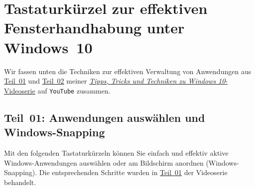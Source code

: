 \documentclass[11pt,a4paper]{scrartcl}
\begin{document}
%
\section*{Tastaturkürzel zur effektiven Fensterhandhabung unter Windows~10}
Wir fassen unten die Techniken zur effektiven Verwaltung von
Anwendungen aus \href{https://youtu.be/wjzZGac1yso}{Teil~01} und
\href{https://youtu.be/FL4_4fquuM4}{Teil~02} meiner
\href{https://youtube.com/playlist?list=PL0FqMC_xCtjQCsFwN8ci8bJhci5xMx1Bm}{\emph{Tipps,
  Tricks und Techniken zu Windows 10}-Videoserie} auf \texttt{YouTube}
zusammen.
%
\subsection*{Teil~01: Anwendungen auswählen und Windows-Snapping}
\label{subsec:windows_snapping}
%
Mit den folgenden Tastaturkürzeln können Sie einfach und effektiv
aktive Windows-Anwendungen auswählen oder am Bildschirm anordnen
(Windows-Snapping). Die entsprechenden Schritte wurden in
\href{https://youtu.be/wjzZGac1yso}{Teil~01} der Videoserie behandelt.
%
\end{document}
